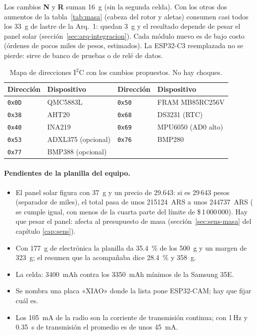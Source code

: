 Los cambios \textbf{N} y \textbf{R} suman \SI{+16}{g} (sin la segunda celda). Con los otros dos
aumentos de la tabla~\ref{tab:masa} (cabeza del rotor y aletas) consumen casi todos los \SI{33}{g} de
lastre de la Arq.~1: quedan \SI{3}{g} y el resultado depende de pesar el panel solar
(sección~\ref{sec:arq-integracion}). Cada módulo nuevo es de bajo costo
(órdenes de pocos miles de pesos, estimados). La ESP32-C3 reemplazada no se pierde: sirve de
banco de pruebas o de relé de datos.

\begin{table}[H]
\centering\small
\caption{Mapa de direcciones I$^2$C con los cambios propuestos. No hay choques.}\label{tab:sens-i2c}
\begin{tabular}{@{}llll@{}}
\toprule
\textbf{Dirección} & \textbf{Dispositivo} & \textbf{Dirección} & \textbf{Dispositivo}\\\midrule
\texttt{0x0D} & QMC5883L & \texttt{0x50} & FRAM MB85RC256V\\
\texttt{0x38} & AHT20 & \texttt{0x68} & DS3231 (RTC)\\
\texttt{0x40} & INA219 & \texttt{0x69} & MPU6050 (AD0 alto)\\
\texttt{0x53} & ADXL375 (opcional) & \texttt{0x76} & BMP280\\
\texttt{0x77} & BMP388 (opcional) & & \\
\bottomrule
\end{tabular}
\end{table}

\paragraph{Pendientes de la planilla del equipo.}
\begin{itemize}[leftmargin=*]
  \item El panel solar figura con \SI{37}{g} y un precio de \num{29.643}: si es 29\,643 pesos
        (separador de miles), el total pasa de unos \SI{215124}{ARS} a unos \SI{244737}{ARS}
        ( se cumple igual, con menos de la cuarta parte del límite de \$\,1\,000\,000). Hay que
        pesar el panel: afecta al presupuesto de masa (sección~\ref{sec:sens-masa} del capítulo
        \ref{cap:sens}).
  \item Con \SI{177}{g} de electrónica la planilla da \SI{35.4}{\percent} de los \SI{500}{g} y un
        margen de \SI{323}{g}; el resumen que la acompañaba dice \SI{28.4}{\percent} y \SI{358}{g}.
  \item La celda: \SI{3400}{mAh} contra los \SI{3350}{mAh} mínimos de la Samsung 35E.
  \item Se nombra una placa «XIAO» donde la lista pone ESP32-CAM; hay que fijar cuál es.
  \item Los \SI{105}{mA} de la radio son la corriente de transmisión continua; con 1\,Hz y
        \SI{0.35}{s} de transmisión el promedio es de unos \SI{45}{mA}.
\end{itemize}


